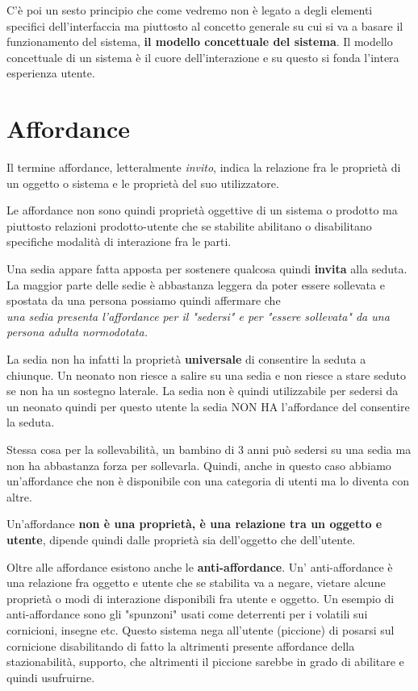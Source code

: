C'è poi un sesto principio che come vedremo non è legato a degli elementi specifici dell'interfaccia ma piuttosto al concetto generale su cui si va a basare il funzionamento del sistema, \textbf{il modello concettuale del sistema}. Il modello concettuale di un sistema è il cuore dell'interazione e su questo si fonda l'intera esperienza utente.

\section{Affordance}
Il termine affordance, letteralmente \textit{invito}, indica la relazione fra le proprietà di un oggetto o sistema e le proprietà del suo utilizzatore. 

Le affordance non sono quindi proprietà oggettive di un sistema o prodotto ma piuttosto relazioni prodotto-utente che se stabilite abilitano o disabilitano specifiche modalità di interazione fra le parti.

Una sedia appare fatta apposta per sostenere qualcosa quindi \textbf{invita} alla seduta. La maggior parte delle sedie è abbastanza leggera da poter essere sollevata e spostata da una persona possiamo quindi affermare che\\

\textit{una sedia presenta l'affordance per il "sedersi" e per "essere sollevata" da una persona adulta normodotata.}

La sedia non ha infatti la proprietà \textbf{universale} di consentire la seduta a chiunque. Un neonato non riesce a salire su una sedia e non riesce a stare seduto se non ha un sostegno laterale. La sedia non è quindi utilizzabile per sedersi da un neonato quindi per questo utente la sedia NON HA l'affordance del consentire la seduta.

Stessa cosa per la sollevabilità, un bambino di 3 anni può sedersi su una sedia ma non ha abbastanza forza per sollevarla. Quindi, anche in questo caso abbiamo un'affordance che non è disponibile con una categoria di utenti ma lo diventa con altre.

Un'affordance \textbf{non è una proprietà, è una relazione tra un oggetto e utente}, dipende quindi dalle proprietà sia dell'oggetto che dell'utente.

Oltre alle affordance esistono anche le \textbf{anti-affordance}. Un' anti-affordance è una relazione fra oggetto e utente che se stabilita va a negare, vietare alcune proprietà o modi di interazione disponibili fra utente e oggetto.
Un esempio di anti-affordance sono gli "spunzoni" usati come deterrenti per i volatili sui cornicioni, insegne etc. Questo sistema nega all'utente (piccione) di posarsi sul cornicione disabilitando di fatto la altrimenti presente affordance della stazionabilità, supporto, che altrimenti il piccione sarebbe in grado di abilitare e quindi usufruirne.

